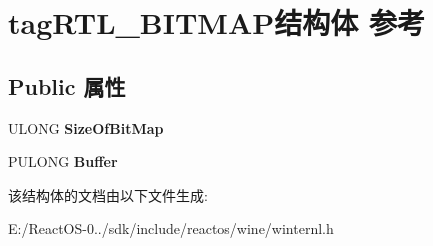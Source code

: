 \hypertarget{structtag_r_t_l___b_i_t_m_a_p}{}\section{tag\+R\+T\+L\+\_\+\+B\+I\+T\+M\+A\+P结构体 参考}
\label{structtag_r_t_l___b_i_t_m_a_p}
\subsection*{Public 属性}
\begin{DoxyCompactItemize}
\item 
\mbox{\label{structtag_r_t_l___b_i_t_m_a_p_a63511720d33583bbed81338256caa117}} 
U\+L\+O\+NG {\bfseries Size\+Of\+Bit\+Map}
\item 
\mbox{\label{structtag_r_t_l___b_i_t_m_a_p_a47004b79437c3d744dc8950abc3d42ec}} 
P\+U\+L\+O\+NG {\bfseries Buffer}
\end{DoxyCompactItemize}


该结构体的文档由以下文件生成\+:\begin{DoxyCompactItemize}
\item 
E\+:/\+React\+O\+S-\/0../sdk/include/reactos/wine/winternl.\+h\end{DoxyCompactItemize}
